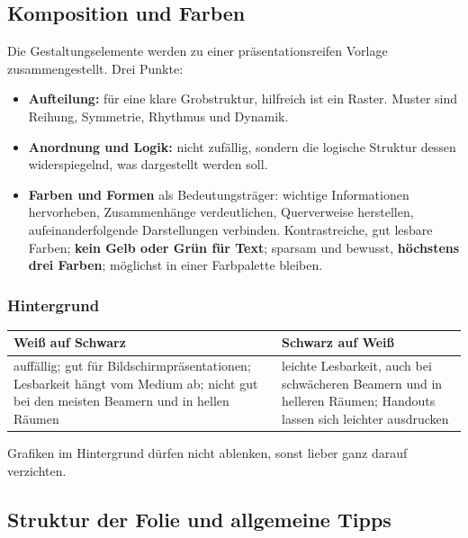 \documentclass[12pt, a4paper]{article}
\begin{document}
\subsection{Komposition und Farben}

Die Gestaltungselemente werden zu einer präsentationsreifen Vorlage
zusammengestellt. Drei Punkte:

\begin{itemize}
  \item \textbf{Aufteilung:} für eine klare Grobstruktur, hilfreich ist ein
        Raster. Muster sind Reihung, Symmetrie, Rhythmus und Dynamik.
  \item \textbf{Anordnung und Logik:} nicht zufällig, sondern die logische
        Struktur dessen widerspiegelnd, was dargestellt werden soll.
  \item \textbf{Farben und Formen} als Bedeutungsträger: wichtige
        Informationen hervorheben, Zusammenhänge verdeutlichen, Querverweise
        herstellen, aufeinanderfolgende Darstellungen verbinden.
        Kontrastreiche, gut lesbare Farben; \textbf{kein Gelb oder Grün für
        Text}; sparsam und bewusst, \textbf{höchstens drei Farben}; möglichst
        in einer Farbpalette bleiben.
\end{itemize}

\subsubsection{Hintergrund}

\begin{center}
\begin{tabular}{p{}p{}}
\textbf{Weiß auf Schwarz} & \textbf{Schwarz auf Weiß}\\\hline
auffällig; gut für Bildschirmpräsentationen; Lesbarkeit hängt vom Medium ab;
nicht gut bei den meisten Beamern und in hellen Räumen
&
leichte Lesbarkeit, auch bei schwächeren Beamern und in helleren Räumen;
Handouts lassen sich leichter ausdrucken\\
\end{tabular}
\end{center}

Grafiken im Hintergrund dürfen nicht ablenken, sonst lieber ganz darauf
verzichten.

\subsection{Struktur der Folie und allgemeine Tipps}
\end{document}
